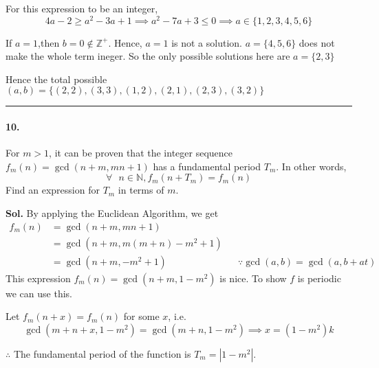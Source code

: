 \documentclass[12pt]{amsart}
\begin{document}
For this expression to be an integer,
$$
4a-2 \ge a^2-3a+1 \implies
a^2-7a+3 \le 0 \implies
a \in \{1,2,3,4,5,6\} 
$$

If $a = 1$,then $b=0 \notin \mathbb{Z}^+$. Hence, $a=1$ is not a solution.
$a = \{4,5,6\}$ does not make the whole term ineger.
So the only possible solutions here are $a=\{2, 3\}$

Hence the total possible $(a,b) = \{ (2,2), (3,3), (1,2), (2,1), (2, 3), (3,2)  \}$

\par\noindent\textcolor{gray}{\rule{\textwidth}{0.5pt}}
\smallskip

\paragraph*{10.} For $ m>1 $, it can be proven that the integer sequence $f_m(n) = \gcd{(n+m, mn+ 1)} $ has a fundamental period $ T_m $.  In other words,$$ \forall \text{ } n \in \mathbb{N} ,  f_m(n+T_m) =f_m(n) $$Find an expression for $T_m$ in terms of $ m $.

\bigskip
\textbf{Sol.}
By applying the Euclidean Algorithm, we get
\begin{align*}
    f_m(n) &= \gcd{(n+m, mn+ 1)} \\
           &= \gcd{(n+m, m(m+n)-m^2+1)} \\
           &= \gcd{(n+m, -m^2+1)} && \because \gcd{(a, b)} = \gcd{(a, b+at)}
\end{align*}
This expression $f_m(n) = \gcd{(n+m, 1-m^2)}$ is nice.
To show $f$ is periodic we can use this.

Let $f_m(n+x) = f_m(n)$ for some $x$, i.e.
$$
\gcd{(m+n+x, 1-m^2)} = \gcd{(m+n, 1-m^2)}
\implies x = (1-m^2)k 
$$

$\therefore$ The fundamental period of the function is $\boxed{T_m = |1-m^2|}$.

\end{document}
